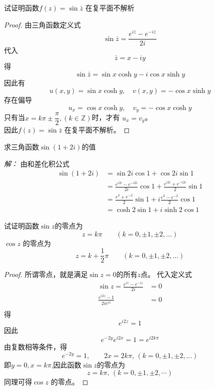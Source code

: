 \begin{example}
  试证明函数$f(z) = \sin \bar{z}$ 在复平面不解析
\end{example}
\begin{proof}
  由三角函数定义式 
  \[ \sin \bar{z} = \frac{e^{i\bar{z}} - e^{-i\bar{z}} }{2i} \]
代入 
\[ \bar{z} = x - iy \]
得 
\[ \sin \bar{z} = \sin x \cosh y  - i \cos x \sinh y \]
因此有 
\[ u(x,y) = \sin x \cosh y , \quad v(x,y) = - \cos x \sinh y\]
存在偏导 
\[ u_x = \cos x \cosh y  , \quad v_y = - \cos x \cosh y\]
只有当$x= k\pi \pm \dfrac{\pi}{2}, (k \in \mathbb{Z})$时，才有 $u_x = v_y$。 \\
因此$f(z) = \sin \bar{z}$ 在复平面不解析。 
\end{proof}

\begin{example}
  求三角函数$ \sin (1 +2 i)$的值
\end{example}
\emph{解：} 由和差化积公式 
\[ \begin{aligned}
  \sin (1 +2 i) &= \sin 2i \cos 1 + \cos 2i \sin 1  \\
    & =  \frac{e^{i 2i } - e^{-i 2i } }{2i} \cos 1  + \frac{e^{i 2i } + e^{-i 2i } }{2}  \sin 1  \\
    & =  \frac{e^{2} + e^{-2} }{2}  \sin 1   + i \frac{e^{2} - e^{-2} }{2} \cos 1 \\
    & = \cosh 2 \sin 1   + i \sinh 2 \cos 1
\end{aligned}\] 
\begin{example}
  试证明函数$ \sin z$的零点为 
  \[z = k \pi \qquad ( k =0, \pm 1, \pm 2, \dots)\]
  $\cos z$ 的零点为 
  \[z = k  + \frac{1}{2}\pi \qquad ( k =0, \pm 1, \pm 2, \dots)\]
\end{example}
\begin{proof}
  所谓零点，就是满足$\sin z =0$的所有$z$点。
  代入定义式
  \[ \begin{aligned}
    \sin z = \frac{e^{iz} - e^{-iz} }{2i} & = 0 \\
    \frac{e^{i2z} - 1 }{2i e^{iz}} & = 0 \\
  \end{aligned}\]
  得 \[ e^{i2z} = 1 \]
  因此 
  \[ e^{-2y} e^{i2x} = 1 = e^{i2k \pi }\]
  由复数相等条件，得
  \[ e^{-2y} = 1, \qquad 2x = 2k \pi, \, (k=0, \pm1, \pm2, \dots)\]
  即$ y =0, x = k \pi $,因此函数$ \sin z$的零点为
  \[ z = k \pi , \, (k=0, \pm1, \pm2, \cdots)\]
  同理可得$\cos z$ 的零点。
\end{proof}

